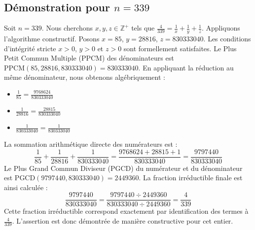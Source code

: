 \documentclass[11pt,a4paper]{article}
\begin{document}
\subsection{Démonstration pour $n = 339$}
Soit $n = 339$. Nous cherchons $x, y, z \in \mathbb{Z}^{+}$ tels que $\frac{4}{339} = \frac{1}{x} + \frac{1}{y} + \frac{1}{z}$.
Appliquons l'algorithme constructif. Posons $x = 85$, $y = 28816$, $z = 830333040$.
Les conditions d'intégrité stricte $x > 0$, $y > 0$ et $z > 0$ sont formellement satisfaites.
Le Plus Petit Commun Multiple (PPCM) des dénominateurs est $\text{PPCM}(85, 28816, 830333040) = 830333040$.
En appliquant la réduction au même dénominateur, nous obtenons algébriquement :
\begin{itemize}
    \item $\frac{1}{85} = \frac{9768624}{830333040}$
    \item $\frac{1}{28816} = \frac{28815}{830333040}$
    \item $\frac{1}{830333040} = \frac{1}{830333040}$
\end{itemize}
La sommation arithmétique directe des numérateurs est :
$$ \frac{1}{85} + \frac{1}{28816} + \frac{1}{830333040} = \frac{9768624 + 28815 + 1}{830333040} = \frac{9797440}{830333040} $$
Le Plus Grand Commun Diviseur (PGCD) du numérateur et du dénominateur est $\text{PGCD}(9797440, 830333040) = 2449360$.
La fraction irréductible finale est ainsi calculée :
$$ \frac{9797440}{830333040} = \frac{9797440 \div 2449360}{830333040 \div 2449360} = \frac{4}{339} $$
Cette fraction irréductible correspond exactement par identification des termes à $\frac{4}{339}$. L'assertion est donc démontrée de manière constructive pour cet entier.
\end{document}
